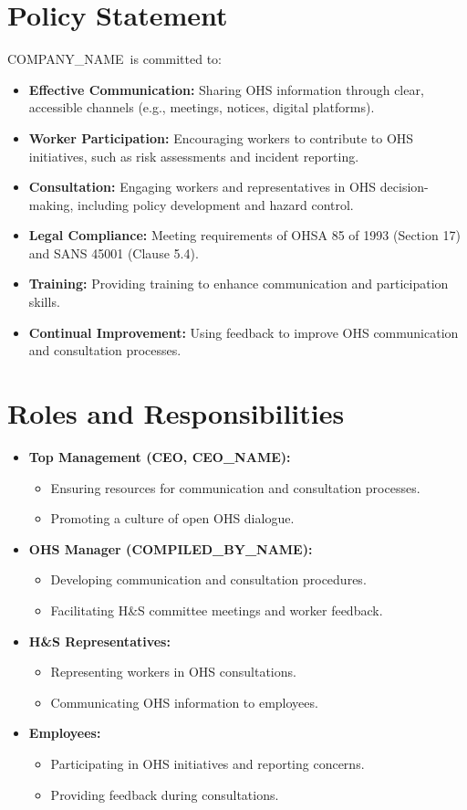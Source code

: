 \documentclass[11pt]{article}
\newcommand{\clientName}{{{COMPANY_NAME}}}
\newcommand{\compilerName}{{{COMPILED_BY_NAME}}}
\begin{document}
\section{Policy Statement}
\clientName\ is committed to:
\begin{itemize}
    \item \textbf{Effective Communication:} Sharing OHS information through clear, accessible channels (e.g., meetings, notices, digital platforms).
    \item \textbf{Worker Participation:} Encouraging workers to contribute to OHS initiatives, such as risk assessments and incident reporting.
    \item \textbf{Consultation:} Engaging workers and representatives in OHS decision-making, including policy development and hazard control.
    \item \textbf{Legal Compliance:} Meeting requirements of OHSA 85 of 1993 (Section 17) and SANS 45001 (Clause 5.4).
    \item \textbf{Training:} Providing training to enhance communication and participation skills.
    \item \textbf{Continual Improvement:} Using feedback to improve OHS communication and consultation processes.
\end{itemize}

\section{Roles and Responsibilities}
\begin{itemize}
    \item \textbf{Top Management (CEO, {{CEO_NAME}}):}
    \begin{itemize}
        \item Ensuring resources for communication and consultation processes.
        \item Promoting a culture of open OHS dialogue.
    \end{itemize}
    \item \textbf{OHS Manager (\compilerName):}
    \begin{itemize}
        \item Developing communication and consultation procedures.
        \item Facilitating H&S committee meetings and worker feedback.
    \end{itemize}
    \item \textbf{H&S Representatives:}
    \begin{itemize}
        \item Representing workers in OHS consultations.
        \item Communicating OHS information to employees.
    \end{itemize}
    \item \textbf{Employees:}
    \begin{itemize}
        \item Participating in OHS initiatives and reporting concerns.
        \item Providing feedback during consultations.
    \end{itemize}
\end{itemize}
\end{document}
